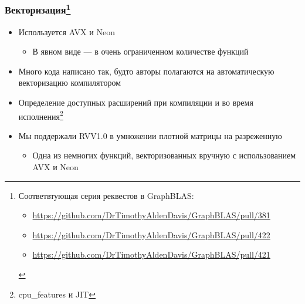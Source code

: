 \documentclass[xcolor=table,aspectratio=169]{beamer}
\begin{document}
\begin{frame}[fragile]
  \frametitle{Векторизация\footnote{%
Соответвтующая серия реквестов в GraphBLAS:
\begin{itemize}
  \item \url{https://github.com/DrTimothyAldenDavis/GraphBLAS/pull/381}
  \item \url{https://github.com/DrTimothyAldenDavis/GraphBLAS/pull/422} 
  \item \url{https://github.com/DrTimothyAldenDavis/GraphBLAS/pull/421}
\end{itemize}
  }}
  \begin{itemize}
    \item Используется AVX и Neon
    \begin{itemize}
      \item В явном виде --- в очень ограниченном количестве функций
    \end{itemize}
    \item Много кода написано так, будто авторы полагаются на автоматическую векторизацию компилятором
    \item Определение доступных расширений при компиляции и во время исполнения\footnote{cpu\_features и JIT}
  \end{itemize}
  \pause 
  \vfill
  \begin{itemize}
    \item Мы поддержали RVV1.0 в умножении плотной матрицы на разреженную
    \begin{itemize}
      \item Одна из немногих функций, векторизованных вручную с использованием AVX и Neon
    \end{itemize}
  \end{itemize}
\end{frame}
\end{document}
